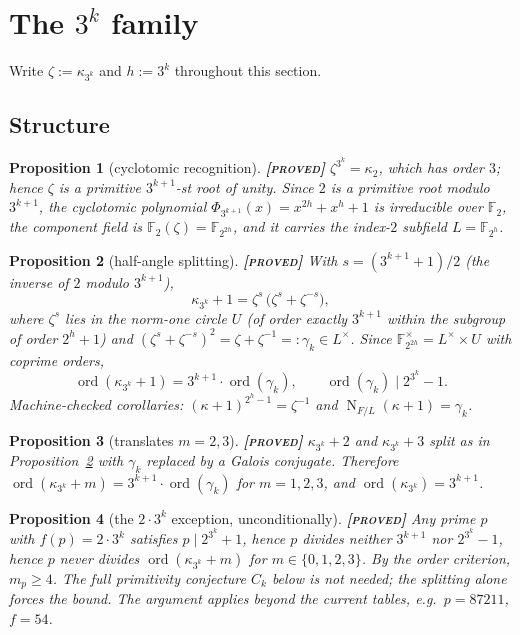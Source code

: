 \documentclass[11pt]{article}
\theoremstyle{plain}
\newtheorem{proposition}{Proposition}
\theoremstyle{definition}
\newcommand{\F}{\mathbb{F}}
\newcommand{\ord}{\operatorname{ord}}
\newcommand{\Norm}{\operatorname{N}}
\newcommand{\PROVED}{\textbf{[\textsc{proved}]}}
\begin{document}
\section{The $3^k$ family}\label{sec:family}

Write $\zeta:=\kappa_{3^k}$ and $h:=3^k$ throughout this section.

\subsection{Structure}

\begin{proposition}[cyclotomic recognition]\label{prop:cyclo}
\PROVED{} $\zeta^{3^k}=\kappa_2$, which has order $3$; hence $\zeta$ is a
primitive $3^{k+1}$-st root of unity. Since $2$ is a primitive root
modulo $3^{k+1}$, the cyclotomic polynomial
$\Phi_{3^{k+1}}(x)=x^{2h}+x^h+1$ is irreducible over $\F_2$, the
component field is $\F_2(\zeta)=\F_{2^{2h}}$, and it carries the index-$2$
subfield $L=\F_{2^h}$.
\end{proposition}

\begin{proposition}[half-angle splitting]\label{prop:halfangle}
\PROVED{} With $s=(3^{k+1}+1)/2$ (the inverse of $2$ modulo $3^{k+1}$),
\[
  \kappa_{3^k}+1=\zeta^{s}\,\bigl(\zeta^{s}+\zeta^{-s}\bigr),
\]
where $\zeta^{s}$ lies in the norm-one circle $U$ (of order exactly
$3^{k+1}$ within the subgroup of order $2^h+1$) and
$(\zeta^{s}+\zeta^{-s})^2=\zeta+\zeta^{-1}=:\gamma_k\in L^{\times}$.
Since $\F_{2^{2h}}^{\times}=L^{\times}\times U$ with coprime orders,
\[
  \ord(\kappa_{3^k}+1)=3^{k+1}\cdot\ord(\gamma_k),
  \qquad
  \ord(\gamma_k)\mid 2^{3^k}-1.
\]
Machine-checked corollaries: $(\kappa+1)^{2^h-1}=\zeta^{-1}$ and
$\Norm_{F/L}(\kappa+1)=\gamma_k$.
\end{proposition}

\begin{proposition}[translates $m=2,3$]\label{prop:translates}
\PROVED{} $\kappa_{3^k}+2$ and $\kappa_{3^k}+3$ split as in
Proposition~\ref{prop:halfangle} with $\gamma_k$ replaced by a Galois
conjugate. Therefore
$\ord(\kappa_{3^k}+m)=3^{k+1}\cdot\ord(\gamma_k)$ for $m=1,2,3$, and
$\ord(\kappa_{3^k})=3^{k+1}$.
\end{proposition}

\begin{proposition}[the $2\cdot3^k$ exception, unconditionally]
\label{prop:exception}
\PROVED{} Any prime $p$ with $f(p)=2\cdot3^k$ satisfies
$p\mid 2^{3^k}+1$, hence $p$ divides neither $3^{k+1}$ nor $2^{3^k}-1$,
hence $p$ never divides $\ord(\kappa_{3^k}+m)$ for $m\in\{0,1,2,3\}$. By
the order criterion, $m_p\geq4$. The full primitivity conjecture $C_k$
below is not needed; the splitting alone forces the bound. The argument
applies beyond the current tables, e.g.\ $p=87211$, $f=54$.
\end{proposition}
\end{document}
